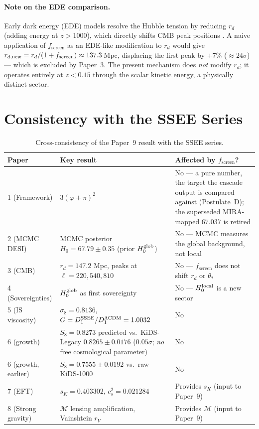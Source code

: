 \documentclass[12pt,a4paper]{article}
\newcommand{\phiG}{\varphi}
\newcommand{\MIRA}{\mathcal{M}}
\newcommand{\Hzero}{H_0}
\newcommand{\fsc}{f_{\mathrm{screen}}}
\begin{document}
\paragraph{Note on the EDE comparison.}
Early dark energy (EDE) models \citep{Karwal2016,Poulin2019,Smith2020}
resolve the Hubble tension by reducing $r_d$
(adding energy at $z > 1000$), which directly shifts CMB peak positions
\citep{Hill2020}.
A naive application of $\fsc$ as an EDE-like modification to $r_d$ would
give $r_{d,\rm new} = r_d/(1+\fsc) \approx 137.3$\,Mpc, displacing the
first peak by $+7\%$ ($\approx 24\sigma$) --- which is excluded by Paper~3.
The present mechanism does \emph{not} modify $r_d$; it operates entirely
at $z < 0.15$ through the scalar kinetic energy, a physically distinct sector.

\section{Consistency with the SSEE Series}
\label{sec:consistency}

\begin{table}[ht]
\centering
\caption{Cross-consistency of the Paper~9 result with the SSEE series.}
\label{tab:consistency}
\begin{tabularx}{\textwidth}{l p{4.5cm} X}
\toprule
Paper & Key result & Affected by $\fsc$? \\
\midrule
1 (Framework) & $3(\phiG+\pi)^2$ & No --- a pure number, the target the
               cascade output is compared against (Postulate~D); the superseded
               MIRA-mapped $67.037$ is retired \\
2 (MCMC DESI) & MCMC posterior $\Hzero = 67.79 \pm 0.35$ (prior $H_0^{\rm glob}$) & No —
               MCMC measures the global background, not local \\
3 (CMB)       & $r_d = 147.2$ Mpc, peaks at $\ell=220,540,810$ & No —
               $\fsc$ does not shift $r_d$ or $\theta_*$ \\
4 (Sovereignties) & $H_0^{\rm glob}$ as first sovereignty & No —
               $H_0^{\rm local}$ is a new sector \\
5 (IS viscosity) & $\sigma_8 = 0.8136$, $G = D_1^{\rm SSEE}/D_1^{\Lambda{\rm CDM}} = 1.0032$ & No \\
6 (growth) & $S_8=0.8273$ predicted vs.\ KiDS-Legacy $0.8265\pm0.0176$ ($0.05\sigma$; \emph{no} free cosmological parameter) & No \\
6 (growth, earlier) & $S_8=0.7555\pm0.0192$ vs.\ raw KiDS-1000 & No \\
7 (EFT)       & $s_K = 0.403302$, $c_s^2 = 0.021284$ & Provides $s_K$
               (input to Paper~9) \\
8 (Strong gravity) & $\MIRA$ lensing amplification, Vainshtein $r_V$ & Provides $\MIRA$
               (input to Paper~9) \\
\bottomrule
\end{tabularx}
\end{table}
\end{document}
